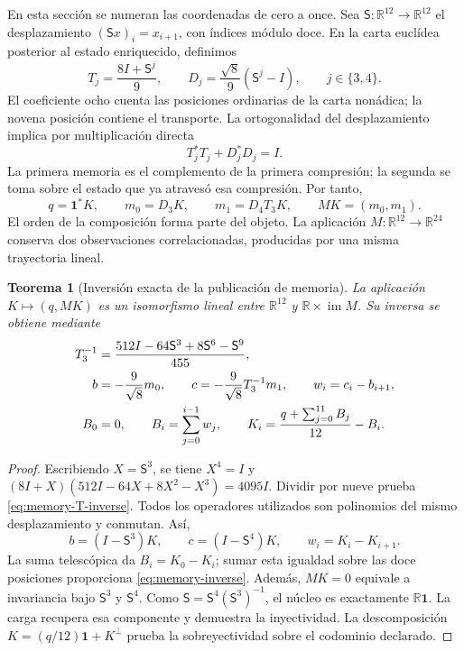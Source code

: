 \documentclass[a4paper,10pt]{article}
\newtheorem{theorem}{Teorema}[section]
\theoremstyle{definition}\newtheorem{definition}[theorem]{Definición}
\theoremstyle{remark}\newtheorem{remark}[theorem]{Observación}
\newcommand{\RR}{\mathbb R}\newcommand{\QQ}{\mathbb Q}
\numberwithin{equation}{section}
\begin{document}
En esta sección se numeran las coordenadas de cero a once. Sea
\(\mathsf S:\RR^{12}\to\RR^{12}\) el desplazamiento
\((\mathsf Sx)_i=x_{i+1}\), con índices módulo doce. En la carta euclídea
posterior al estado enriquecido, definimos
\[
 T_j=\frac{8I+\mathsf S^j}{9},\qquad
 D_j=\frac{\sqrt8}{9}(\mathsf S^j-I),\qquad j\in\{3,4\}.
\]
El coeficiente ocho cuenta las posiciones ordinarias de la carta nonádica;
la novena posición contiene el transporte. La ortogonalidad del desplazamiento
implica por multiplicación directa
\[
 T_j^*T_j+D_j^*D_j=I.
\]
La primera memoria es el complemento de la primera compresión; la segunda
se toma sobre el estado que ya atravesó esa compresión. Por tanto,
\begin{equation}
 q=\mathbf1^*K,\qquad m_0=D_3K,\qquad m_1=D_4T_3K,
 \qquad MK=(m_0,m_1).
 \label{eq:mem-data}
\end{equation}
El orden de la composición forma parte del objeto. La aplicación
\(M:\RR^{12}\to\RR^{24}\) conserva dos observaciones correlacionadas,
producidas por una misma trayectoria lineal.

\begin{theorem}[Inversión exacta de la publicación de memoria]
\label{thm:memory-inversion}
La aplicación \(K\mapsto(q,MK)\) es un isomorfismo lineal entre
\(\RR^{12}\) y \(\RR\times\operatorname{im}M\). Su inversa se obtiene
mediante
\begin{align}
 T_3^{-1}&=\frac{512I-64\mathsf S^3+8\mathsf S^6-\mathsf S^9}{455},
 \label{eq:memory-T-inverse}\\
 b&=-\frac9{\sqrt8}m_0,\qquad
 c=-\frac9{\sqrt8}T_3^{-1}m_1,\qquad w_i=c_i-b_{i+1},\notag\\
 B_0&=0,\qquad B_i=\sum_{j=0}^{i-1}w_j,\qquad
 K_i=\frac{q+\sum_{j=0}^{11}B_j}{12}-B_i.
 \label{eq:memory-inverse}
\end{align}
\end{theorem}
\begin{proof}
Escribiendo \(X=\mathsf S^3\), se tiene \(X^4=I\) y
\((8I+X)(512I-64X+8X^2-X^3)=4095I\). Dividir por nueve
prueba \eqref{eq:memory-T-inverse}. Todos los operadores utilizados son
polinomios del mismo desplazamiento y conmutan. Así,
\[
 b=(I-\mathsf S^3)K,\qquad c=(I-\mathsf S^4)K,
 \qquad w_i=K_i-K_{i+1}.
\]
La suma telescópica da \(B_i=K_0-K_i\); sumar esta igualdad sobre
las doce posiciones proporciona \eqref{eq:memory-inverse}. Además,
\(MK=0\) equivale a invariancia bajo \(\mathsf S^3\) y
\(\mathsf S^4\). Como \(\mathsf S=\mathsf S^4(\mathsf S^3)^{-1}\),
el núcleo es exactamente \(\RR\mathbf1\). La carga recupera esa
componente y demuestra la inyectividad. La descomposición
\(K=(q/12)\mathbf1+K^\perp\) prueba la sobreyectividad sobre el
codominio declarado.
\end{proof}
\end{document}
